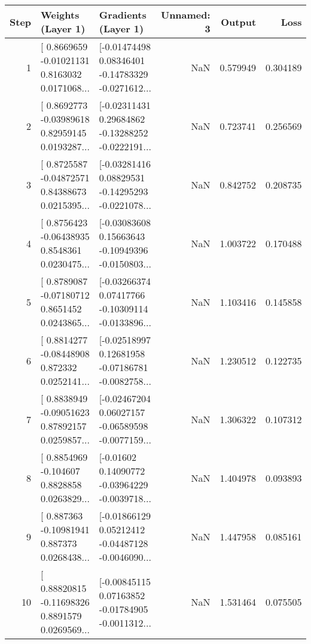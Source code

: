 \begin{tabular}{rllrrr}
\toprule
 Step &                                  Weights (Layer 1) &                                Gradients (Layer 1) &  Unnamed: 3 &   Output &     Loss \\
\midrule
    1 & [ 0.8669659  -0.01021131  0.8163032   0.0171068... & [-0.01474498  0.08346401 -0.14783329 -0.0271612... &         NaN & 0.579949 & 0.304189 \\
    2 & [ 0.8692773  -0.03989618  0.82959145  0.0193287... & [-0.02311431  0.29684862 -0.13288252 -0.0222191... &         NaN & 0.723741 & 0.256569 \\
    3 & [ 0.8725587  -0.04872571  0.84388673  0.0215395... & [-0.03281416  0.08829531 -0.14295293 -0.0221078... &         NaN & 0.842752 & 0.208735 \\
    4 & [ 0.8756423  -0.06438935  0.8548361   0.0230475... & [-0.03083608  0.15663643 -0.10949396 -0.0150803... &         NaN & 1.003722 & 0.170488 \\
    5 & [ 0.8789087  -0.07180712  0.8651452   0.0243865... & [-0.03266374  0.07417766 -0.10309114 -0.0133896... &         NaN & 1.103416 & 0.145858 \\
    6 & [ 0.8814277  -0.08448908  0.872332    0.0252141... & [-0.02518997  0.12681958 -0.07186781 -0.0082758... &         NaN & 1.230512 & 0.122735 \\
    7 & [ 0.8838949  -0.09051623  0.87892157  0.0259857... & [-0.02467204  0.06027157 -0.06589598 -0.0077159... &         NaN & 1.306322 & 0.107312 \\
    8 & [ 0.8854969  -0.104607    0.8828858   0.0263829... & [-0.01602     0.14090772 -0.03964229 -0.0039718... &         NaN & 1.404978 & 0.093893 \\
    9 & [ 0.887363   -0.10981941  0.887373    0.0268438... & [-0.01866129  0.05212412 -0.04487128 -0.0046090... &         NaN & 1.447958 & 0.085161 \\
   10 & [ 0.88820815 -0.11698326  0.8891579   0.0269569... & [-0.00845115  0.07163852 -0.01784905 -0.0011312... &         NaN & 1.531464 & 0.075505 \\
\bottomrule
\end{tabular}
